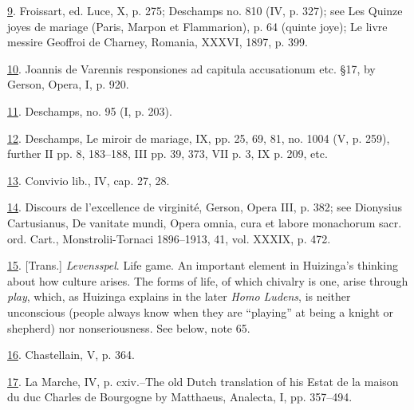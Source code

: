 \protect\hypertarget{23_NOTES.xhtmlux5cux23id_2069}{\protect\hyperlink{09_Chapter_Two__THE_CRAVING_FOR_A_M.xhtmlux5cux23id_2068}{9}}.
Froissart, ed. Luce, X, p. 275; Deschamps no. 810 (IV, p. 327); see Les
Quinze joyes de mariage (Paris, Marpon et Flammarion), p. 64 (quinte
joye); Le livre messire Geoffroi de Charney, Romania, XXXVI, 1897, p.
399.

\protect\hypertarget{23_NOTES.xhtmlux5cux23id_2067}{\protect\hyperlink{09_Chapter_Two__THE_CRAVING_FOR_A_M.xhtmlux5cux23id_2066}{10}}.
Joannis de Varennis responsiones ad capitula accusationum etc. §17, by
Gerson, Opera, I, p. 920.

\protect\hypertarget{23_NOTES.xhtmlux5cux23id_2065}{\protect\hyperlink{09_Chapter_Two__THE_CRAVING_FOR_A_M.xhtmlux5cux23id_2064}{11}}.
Deschamps, no. 95 (I, p. 203).

\protect\hypertarget{23_NOTES.xhtmlux5cux23id_2063}{\protect\hyperlink{09_Chapter_Two__THE_CRAVING_FOR_A_M.xhtmlux5cux23id_2062}{12}}.
Deschamps, Le miroir de mariage, IX, pp. 25, 69, 81, no. 1004 (V, p.
259), further II pp. 8, 183--188, III pp. 39, 373, VII p. 3, IX p. 209,
etc.

\protect\hypertarget{23_NOTES.xhtmlux5cux23id_2061}{\protect\hyperlink{09_Chapter_Two__THE_CRAVING_FOR_A_M.xhtmlux5cux23id_2060}{13}}.
Convivio lib., IV, cap. 27, 28.

\protect\hypertarget{23_NOTES.xhtmlux5cux23page_402}{\protect\hyperlink{09_Chapter_Two__THE_CRAVING_FOR_A_M.xhtmlux5cux23id_2059}{14}}.
Discours de l'excellence de virginité, Gerson, Opera III, p. 382; see
Dionysius Cartusianus, De vanitate mundi, Opera omnia, cura et labore
monachorum sacr. ord. Cart., Monstrolii-Tornaci 1896--1913, 41, vol.
XXXIX, p. 472.

\protect\hypertarget{23_NOTES.xhtmlux5cux23id_2058}{\protect\hyperlink{09_Chapter_Two__THE_CRAVING_FOR_A_M.xhtmlux5cux23id_2057}{15}}.
{[}Trans.{]} \emph{Levensspel}. Life game. An important element in
Huizinga's thinking about how culture arises. The forms of life, of
which chivalry is one, arise through \emph{play}, which, as Huizinga
explains in the later \emph{Homo Ludens}, is neither unconscious (people
always know when they are ``playing'' at being a knight or shepherd) nor
nonseriousness. See below, note 65.

\protect\hypertarget{23_NOTES.xhtmlux5cux23id_2056}{\protect\hyperlink{09_Chapter_Two__THE_CRAVING_FOR_A_M.xhtmlux5cux23id_2055}{16}}.
Chastellain, V, p. 364.

\protect\hypertarget{23_NOTES.xhtmlux5cux23id_2054}{\protect\hyperlink{09_Chapter_Two__THE_CRAVING_FOR_A_M.xhtmlux5cux23id_2053}{17}}.
La Marche, IV, p. cxiv.--The old Dutch translation of his Estat de la
maison du duc Charles de Bourgogne by Matthaeus, Analecta, I, pp.
357--494.

